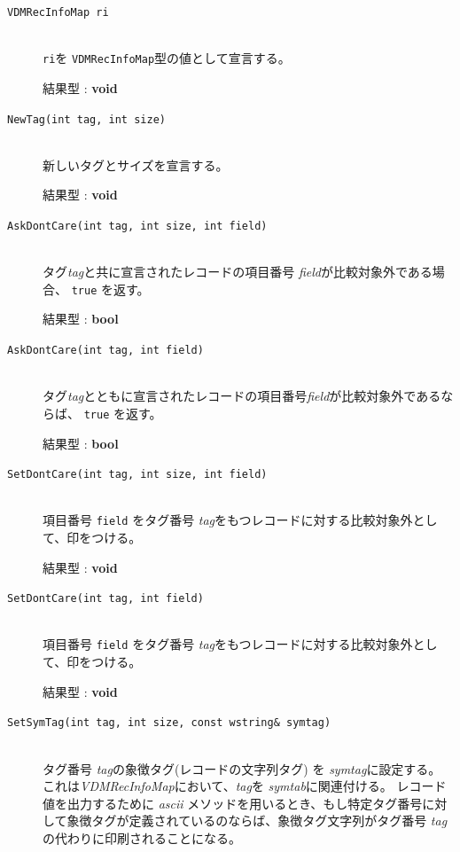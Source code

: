 \documentclass[\pformat,12pt]{jarticle}
\begin{document}
\begin{description}
\item[{\tt VDMRecInfoMap ri}]\mbox{}\\
   {\tt ri}を {\tt VDMRecInfoMap}型の値として宣言する。

  結果型 : {\bf void}
\item[{\tt NewTag(int tag, int size)}] \mbox{}\\
  新しいタグとサイズを宣言する。

  結果型 : {\bf void}
\item[{\tt AskDontCare(int tag, int size, int field)  }] \mbox{}\\
  タグ{\em tag}と共に宣言されたレコードの項目番号 {\em field}が比較対象外である場合、 {\tt true} を返す。

  結果型 : {\bf bool}

\item[{\tt AskDontCare(int tag, int field)  }] \mbox{}\\
  
  タグ{\em tag}とともに宣言されたレコードの項目番号{\em field}が比較対象外であるならば、 {\tt true} を返す。

  結果型 : {\bf bool}

\item[{\tt SetDontCare(int tag, int size, int field)}]\mbox{}\\

  項目番号 {\tt field} をタグ番号 {\em tag}をもつレコードに対する比較対象外として、印をつける。

  結果型 : {\bf void}

\item[{\tt SetDontCare(int tag, int field)}]\mbox{}\\

  項目番号 {\tt field} をタグ番号 {\em tag}をもつレコードに対する比較対象外として、印をつける。

  結果型 : {\bf void}

\item[{\tt SetSymTag(int tag, int size, const wstring\& symtag)}]\mbox{}\\
  
  タグ番号 {\em tag}の象徴タグ(レコードの文字列タグ) を {\em symtag}に設定する。
  これは{\em VDMRecInfoMap}において、{\em tag}を {\em symtab}に関連付ける。
レコード値を出力するために {\em ascii} メソッドを用いるとき、もし特定タグ番号に対して象徴タグが定義されているのならば、象徴タグ文字列がタグ番号 {\em tag}の代わりに印刷されることになる。


\end{description}
\end{document}
